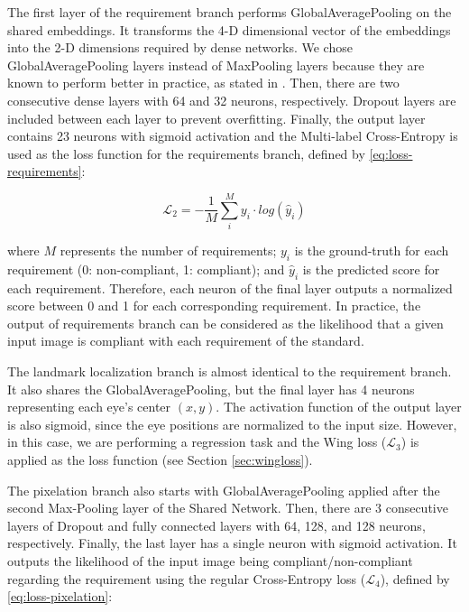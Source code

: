 The first layer of the requirement branch performs GlobalAveragePooling on the shared embeddings. It transforms the 4-D dimensional vector of the embeddings into the 2-D dimensions required by dense networks. We chose GlobalAveragePooling layers instead of MaxPooling layers because they are known to perform better in practice, as stated in \cite{zhou2016learning}. Then, there are two consecutive dense layers with 64 and 32 neurons, respectively. Dropout layers are included between each layer to prevent overfitting. Finally, the output layer contains 23 neurons with sigmoid activation and the Multi-label Cross-Entropy is used as the loss function for the requirements branch, defined by \autoref{eq:loss-requirements}: 
 
\begin{equation}
\label{eq:loss-requirements}
\mathcal{L}_2 = -\frac{1}{M} \sum_i^M {y_i \cdot log(\hat{y}_i)}
\end{equation}

\noindent where $M$ represents the number of requirements; $y_i$ is the ground-truth for each requirement (0: non-compliant, 1: compliant); and $\hat{y}_i$ is the predicted score for each requirement. Therefore, each neuron of the final layer outputs a normalized score between 0 and 1 for each corresponding requirement. In practice, the output of requirements branch can be considered as the likelihood that a given input image is compliant with each requirement of the \icao standard.
 
The landmark localization branch is almost identical to the requirement branch. It also shares the GlobalAveragePooling, but the final layer has 4 neurons representing each eye's center $(x, y)$. The activation function of the output layer is also sigmoid, since the eye positions are normalized to the input size. However, in this case, we are performing a regression task and the Wing loss ($\mathcal{L}_3$) is applied as the loss function (see Section \ref{sec:wingloss}).
 
The pixelation branch also starts with GlobalAveragePooling applied after the second Max-Pooling layer of the Shared Network. Then, there are 3 consecutive layers of Dropout and fully connected layers with 64, 128, and 128 neurons, respectively. Finally, the last layer has a single neuron with sigmoid activation. It outputs the likelihood of the input image being compliant/non-compliant regarding the \pixelation requirement using the regular Cross-Entropy loss ($\mathcal{L}_4$), defined by \autoref{eq:loss-pixelation}:

